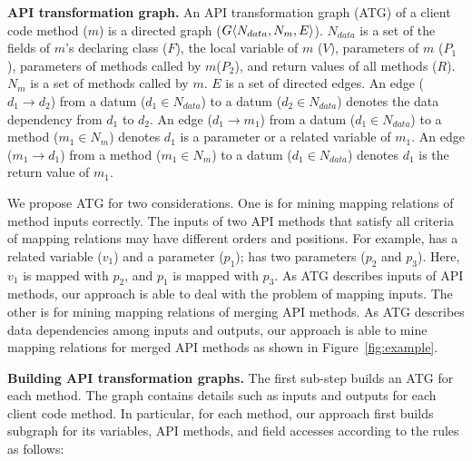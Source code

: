 \textbf{API transformation graph.} An API transformation graph (ATG)
of a client code method ($m$) is a directed graph
($G\langle N_{data}, N_{m}, E \rangle$). $N_{data}$ is a set of the fields
of $m$'s declaring class ($F$), the local variable of $m$ ($V$),
parameters of $m$ ($P_1$), parameters of methods called by
$m$($P_2$), and return values of all methods ($R$). $N_{m}$ is a set
of methods called by $m$. $E$ is a set of directed edges. An edge
($d_1\rightarrow d_2$) from a datum ($d_1 \in N_{data}$) to a datum
($d_2 \in N_{data}$) denotes the data dependency from $d_1$ to
$d_2$. An edge ($d_1 \rightarrow m_1$) from a datum ($d_1 \in
N_{data}$)  to a method ($ m_1 \in N_{m}$) denotes $d_1$ is a
parameter or a related variable of $m_1$. An edge ($m_1 \rightarrow
d_1$) from a method ($ m_1 \in N_{m}$) to a datum ($d_1 \in
N_{data}$) denotes $d_1$ is the return value of $m_1$.

We propose ATG for two considerations. One is for mining mapping
relations of method inputs correctly. The inputs of two API methods
that satisfy all criteria of mapping relations may have different
orders and positions. For example,  has a related variable ($v_1$) and a parameter
($p_1$);  has two
parameters ($p_2$ and $p_3$). Here, $v_1$ is mapped with $p_2$, and
$p_1$ is mapped with $p_3$. As ATG describes inputs of API methods,
our approach is able to deal with the problem of mapping inputs. The
other is for mining mapping relations of merging API methods. As ATG
describes data dependencies among inputs and outputs, our approach
is able to mine mapping relations for merged API methods as shown in
Figure~\ref{fig:example}.

\textbf{Building API transformation graphs.} The first sub-step
builds an ATG for each method. The graph contains details such as
inputs and outputs for each client code method. In particular, for
each method, our approach first builds subgraph for its variables,
API methods, and field accesses according to the rules as follows:


